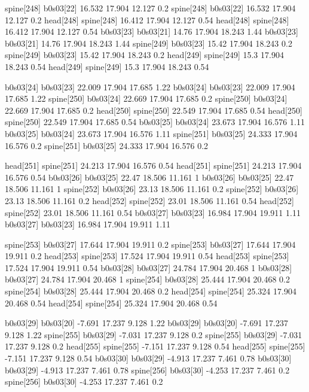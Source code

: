 spine[248]    b0s03[22]    16.532    17.904    12.127    0.2
spine[248]    b0s03[22]    16.532    17.904    12.127    0.2
head[248]    spine[248]    16.412    17.904    12.127    0.54
head[248]    spine[248]    16.412    17.904    12.127    0.54
b0s03[23]    b0s03[21]    14.76    17.904    18.243    1.44
b0s03[23]    b0s03[21]    14.76    17.904    18.243    1.44
spine[249]    b0s03[23]    15.42    17.904    18.243    0.2
spine[249]    b0s03[23]    15.42    17.904    18.243    0.2
head[249]    spine[249]    15.3    17.904    18.243    0.54
head[249]    spine[249]    15.3    17.904    18.243    0.54


b0s03[24]    b0s03[23]    22.009    17.904    17.685    1.22
b0s03[24]    b0s03[23]    22.009    17.904    17.685    1.22
spine[250]    b0s03[24]    22.669    17.904    17.685    0.2
spine[250]    b0s03[24]    22.669    17.904    17.685    0.2
head[250]    spine[250]    22.549    17.904    17.685    0.54
head[250]    spine[250]    22.549    17.904    17.685    0.54
b0s03[25]    b0s03[24]    23.673    17.904    16.576    1.11
b0s03[25]    b0s03[24]    23.673    17.904    16.576    1.11
spine[251]    b0s03[25]    24.333    17.904    16.576    0.2
spine[251]    b0s03[25]    24.333    17.904    16.576    0.2


head[251]    spine[251]    24.213    17.904    16.576    0.54
head[251]    spine[251]    24.213    17.904    16.576    0.54
b0s03[26]    b0s03[25]    22.47    18.506    11.161    1
b0s03[26]    b0s03[25]    22.47    18.506    11.161    1
spine[252]    b0s03[26]    23.13    18.506    11.161    0.2
spine[252]    b0s03[26]    23.13    18.506    11.161    0.2
head[252]    spine[252]    23.01    18.506    11.161    0.54
head[252]    spine[252]    23.01    18.506    11.161    0.54
b0s03[27]    b0s03[23]    16.984    17.904    19.911    1.11
b0s03[27]    b0s03[23]    16.984    17.904    19.911    1.11


spine[253]    b0s03[27]    17.644    17.904    19.911    0.2
spine[253]    b0s03[27]    17.644    17.904    19.911    0.2
head[253]    spine[253]    17.524    17.904    19.911    0.54
head[253]    spine[253]    17.524    17.904    19.911    0.54
b0s03[28]    b0s03[27]    24.784    17.904    20.468    1
b0s03[28]    b0s03[27]    24.784    17.904    20.468    1
spine[254]    b0s03[28]    25.444    17.904    20.468    0.2
spine[254]    b0s03[28]    25.444    17.904    20.468    0.2
head[254]    spine[254]    25.324    17.904    20.468    0.54
head[254]    spine[254]    25.324    17.904    20.468    0.54


b0s03[29]    b0s03[20]    -7.691    17.237    9.128    1.22
b0s03[29]    b0s03[20]    -7.691    17.237    9.128    1.22
spine[255]    b0s03[29]    -7.031    17.237    9.128    0.2
spine[255]    b0s03[29]    -7.031    17.237    9.128    0.2
head[255]    spine[255]    -7.151    17.237    9.128    0.54
head[255]    spine[255]    -7.151    17.237    9.128    0.54
b0s03[30]    b0s03[29]    -4.913    17.237    7.461    0.78
b0s03[30]    b0s03[29]    -4.913    17.237    7.461    0.78
spine[256]    b0s03[30]    -4.253    17.237    7.461    0.2
spine[256]    b0s03[30]    -4.253    17.237    7.461    0.2


